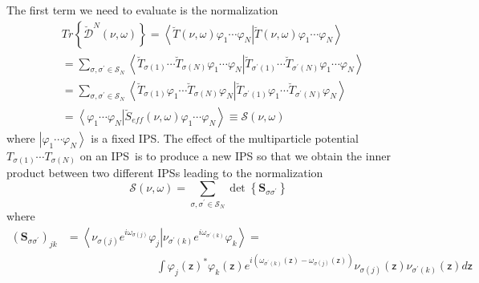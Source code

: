 \documentclass[aps,preprint]{revtex4}%
\begin{document}
The first term we need to evaluate is the normalization
\begin{align}
&  Tr\left\{  \mathcal{\breve{D}}^{N}\left(  \nu,\omega\right)  \right\}
=\left\langle \breve{T}\left(  \nu,\omega\right)  \varphi_{1}\cdots\varphi
_{N}\right\vert \left.  \breve{T}\left(  \nu,\omega\right)  \varphi_{1}%
\cdots\varphi_{N}\right\rangle \nonumber\\
&  =\sum_{\sigma,\sigma^{\prime}\in\mathcal{S}_{N}}\left\langle \breve
{T}_{\sigma\left(  1\right)  }\cdots\breve{T}_{\sigma\left(  N\right)
}\varphi_{1}\cdots\varphi_{N}\right.  \left\vert \breve{T}_{\sigma^{\prime
}\left(  1\right)  }\cdots\breve{T}_{\sigma^{\prime}\left(  N\right)  }%
\varphi_{1}\cdots\varphi_{N}\right\rangle \nonumber\\
&  =\sum_{\sigma,\sigma^{\prime}\in\mathcal{S}_{N}}\left\langle \breve
{T}_{\sigma\left(  1\right)  }\varphi_{1}\cdots\breve{T}_{\sigma\left(
N\right)  }\varphi_{N}\right.  \left\vert \breve{T}_{\sigma^{\prime}\left(
1\right)  }\varphi_{1}\cdots\breve{T}_{\sigma^{\prime}\left(  N\right)
}\varphi_{N}\right\rangle \nonumber\\
&  =\left\langle \varphi_{1}\cdots\varphi_{N}\right\vert \left.  \breve
{S}_{eff}\left(  \nu,\omega\right)  \varphi_{1}\cdots\varphi_{N}\right\rangle
\equiv\mathcal{S}\left(  \nu,\omega\right)
\end{align}
where $\left\vert \varphi_{1}\cdots\varphi_{N}\right\rangle $ is a fixed IPS.
The effect of the multiparticle potential $T_{\sigma\left(  1\right)  }\cdots
T_{\sigma\left(  N\right)  }$ on an IPS\ is to produce a new IPS so that we
obtain the inner product between two different IPSs leading to the
normalization
\begin{equation}
\mathcal{S}\left(  \nu,\omega\right)  =%
{\textstyle\sum\limits_{\sigma,\sigma^{\prime}\in\mathcal{S}_{N}}}
\det\left\{  \mathbf{S}_{\sigma\sigma^{\prime}}\right\}
\end{equation}
where
\begin{align}
\left(  \mathbf{S}_{\sigma\sigma^{\prime}}\right)  _{jk}  &  =\left\langle
\left.  \nu_{\sigma\left(  j\right)  }e^{i\omega_{\sigma\left(  j\right)  }%
}\varphi_{j}\right\vert \nu_{\sigma^{\prime}\left(  k\right)  }e^{i\omega
_{\sigma^{\prime}\left(  k\right)  }}\varphi_{k}\right\rangle =\nonumber\\
&  \qquad\qquad\qquad\qquad%
{\displaystyle\int}
\varphi_{j}\left(  \mathsf{z}\right)  ^{\ast}\varphi_{k}\left(  \mathsf{z}%
\right)  e^{i\left(  \omega_{\sigma^{\prime}\left(  k\right)  }\left(
\mathsf{z}\right)  -\omega_{\sigma\left(  j\right)  }\left(  \mathsf{z}%
\right)  \right)  }\nu_{\sigma\left(  j\right)  }\left(  \mathsf{z}\right)
\nu_{\sigma^{\prime}\left(  k\right)  }\left(  \mathsf{z}\right)  d\mathsf{z}%
\end{align}
\end{document}

